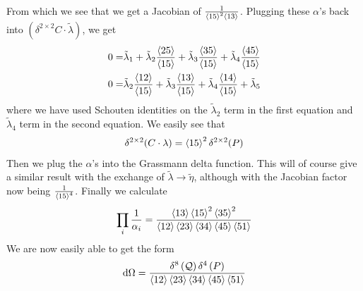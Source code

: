 \documentclass[letter,11pt]{article}
\begin{document}
From which we see that we get a Jacobian of $\frac{1}{\expval{15}^2\expval{13}}$. Plugging these $\alpha$'s back into $(\delta^{2\times 2}C\cdot\tilde \lambda)$, we get
\begin{equation}
	\begin{aligned}
0=&\tilde\lambda_1
+
\tilde\lambda_2 \frac{\expval{25}}{\expval{15}}
+
\tilde\lambda_3
\frac{\expval{35}}{\expval{15}}
+
\tilde\lambda_4
\frac{\expval{45}}{\expval{15}}\\
0=&\tilde\lambda_2 \frac{\expval{12}}{\expval{15}}
+
\tilde\lambda_3
\frac{\expval{13}}{\expval{15}}
+
\tilde\lambda_4 \frac{\expval{14}}{\expval{15}}
+
\tilde\lambda_5
\end{aligned}
\end{equation}
where we have used Schouten identities on the $\tilde\lambda_2$ term in the first equation and $\tilde \lambda_4$ term in the second equation. We easily see that
\begin{equation}
	\begin{aligned}
		\delta^{2\times 2}(C\cdot\lambda)=\expval{15}^2\delta^{2\times 2}(P)
	\end{aligned}
\end{equation}
Then we plug the $\alpha$'s into the Grassmann delta function. This will of course give a similar result with the exchange of $\tilde\lambda\to \tilde\eta$, although with the Jacobian factor now being $\frac{1}{\expval{15}^4}$. Finally we calculate
\begin{equation}
	\begin{aligned}
		\prod_i\frac{1}{\alpha_i}=\frac{\expval{13} \expval{15}^2 \expval{35}^2}{\expval{12}\expval{23}\expval{34}\expval{45}\expval{51}}
	\end{aligned}
\end{equation}
We are now easily able to get the form
\begin{equation}
	\begin{aligned}
		\dd \Omega =
		\frac{\delta^{8}\left(\mathcal{Q}\right)\delta^{4}\left(P\right)}{\expval{12}\expval{23}\expval{34}\expval{45}\expval{51}}
	\end{aligned}
\end{equation}
\end{document}
